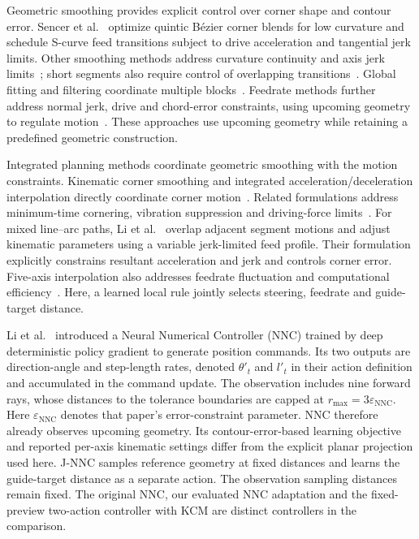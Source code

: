 \documentclass[preprint,12pt]{elsarticle}
\begin{document}
Geometric smoothing provides explicit control over corner shape and contour error. Sencer et al.~\citep{Sencer2014} optimize quintic B\'ezier corner blends for low curvature and schedule S-curve feed transitions subject to drive acceleration and tangential jerk limits. Other smoothing methods address curvature continuity and axis jerk limits~\citep{Fan2015,Zhang2018}; short segments also require control of overlapping transitions~\citep{Hu2024,Yan2023}. Global fitting and filtering coordinate multiple blocks~\citep{Song2021,Yang2015}. Feedrate methods further address normal jerk, drive and chord-error constraints, using upcoming geometry to regulate motion~\citep{Zhang2021,Wu2022,Tsai2010,Song2020,Zhao2013}. These approaches use upcoming geometry while retaining a predefined geometric construction.

Integrated planning methods coordinate geometric smoothing with the motion constraints. Kinematic corner smoothing and integrated acceleration/deceleration interpolation directly coordinate corner motion~\citep{Tajima2016,Tsai2016}. Related formulations address minimum-time cornering, vibration suppression and driving-force limits~\citep{Duan2016,Sencer2015,LiDriving2017}. For mixed line--arc paths, Li et al.~\citep{Li2023} overlap adjacent segment motions and adjust kinematic parameters using a variable jerk-limited feed profile. Their formulation explicitly constrains resultant acceleration and jerk and controls corner error. Five-axis interpolation also addresses feedrate fluctuation and computational efficiency~\citep{Sun2024}. Here, a learned local rule jointly selects steering, feedrate and guide-target distance.

Li et al.~\citep{Li2020} introduced a Neural Numerical Controller (NNC) trained by deep deterministic policy gradient to generate position commands. Its two outputs are direction-angle and step-length rates, denoted $\theta'_t$ and $l'_t$ in their action definition and accumulated in the command update. The observation includes nine forward rays, whose distances to the tolerance boundaries are capped at $r_{\max}=3\varepsilon_{\mathrm{NNC}}$. Here $\varepsilon_{\mathrm{NNC}}$ denotes that paper's error-constraint parameter. NNC therefore already observes upcoming geometry. Its contour-error-based learning objective and reported per-axis kinematic settings differ from the explicit planar projection used here. J-NNC samples reference geometry at fixed distances and learns the guide-target distance as a separate action. The observation sampling distances remain fixed. The original NNC, our evaluated NNC adaptation and the fixed-preview two-action controller with KCM are distinct controllers in the comparison.
\end{document}
